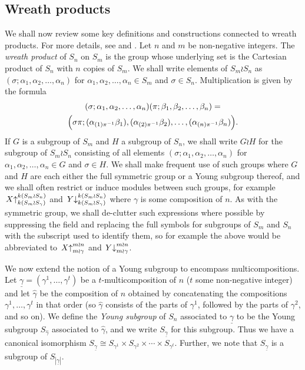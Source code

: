 \documentclass[ALCO,Unicode,published]{cedram}
\newcommand{\ul}[1]{\underline{#1}}
\begin{document}
\subsection{Wreath products}
We shall now review some key definitions and constructions connected to wreath products. For more details, see \cite{CHTAN} and
\cite[Chapter 4]{JAMKER}.
Let $n$ and $m$ be non-negative integers. The \textit{wreath product} of $S_n$ on $S_m$ is the group whose underlying set is the
Cartesian product of $S_n$ with $n$ copies of $S_m$. We shall write elements of $S_m{\wr}S_n$ as
$(\sigma;\alpha_1,\alpha_2,\ldots,\alpha_n)$ for $\alpha_1,\alpha_2,\ldots,\alpha_n \in S_m$ and $\sigma \in S_n$. Multiplication is given
by the formula
\begin{multline*}
	(\sigma;\alpha_1,\alpha_2,\ldots,\alpha_n)(\pi;\beta_1,\beta_2,\ldots,\beta_n) =\\
	\Bigl(\sigma\pi;(\alpha_{(1)\pi^{-1}}\beta_1),(\alpha_{(2)\pi^{-1}}\beta_2),\ldots,(\alpha_{(n)\pi^{-1}}\beta_n)\Bigr).
\end{multline*}
If $G$ is a subgroup of $S_m$ and $H$ a subgroup of $S_n$, we shall write $G{\wr}H$ for the subgroup of $S_m{\wr}S_n$
consisting of all elements $(\sigma;\alpha_1,\alpha_2,\ldots,\alpha_n)$ for $\alpha_1,\alpha_2,\ldots,\alpha_n \in G$ and $\sigma \in H$.
We shall make frequent use of such groups where $G$ and $H$ are each either the full symmetric group or a Young subgroup thereof, and we
shall often restrict or induce modules between such groups, for example
$\left.X\right\uparrow^{k(S_m{\wr}S_n)}_{k(S_m{\wr}S_\gamma)}$ and $\left.Y\right\downarrow^{k({S_m{\wr}S_n})}_{k({S_m{\wr}S_\gamma})}$
where $\gamma$ is some composition of $n$. As with the symmetric group, we shall de-clutter such expressions where possible by suppressing
the field and replacing the full symbols for subgroups of $S_m$ and $S_n$ with the subscript used to identify them,
so for example the above would be abbreviated to
$\left.X\right\uparrow^{m{\wr}n}_{m{\wr}\gamma}$ and $\left.Y\right\downarrow^{m{\wr}n}_{m{\wr}\gamma}$.

We now extend the notion of a Young subgroup to encompass multicompositions.
Let $\ul{\gamma} = (\gamma^1,\ldots,\gamma^t)$ be a $t$-multicomposition of $n$ ($t$ some non-negative integer) and let $\hat\gamma$ be
the composition of $n$ obtained by concatenating the compositions $\gamma^1,\ldots,\gamma^t$ in that order (so $\hat\gamma$ consists of
the parts of $\gamma^1$, followed by the parts of $\gamma^2$, and so on). We define the \textit{Young subgroup} of $S_n$ associated to
$\ul{\gamma}$ to be the Young subgroup $S_{\hat\gamma}$ associated to $\hat\gamma$, and we write $S_{\ul{\gamma}}$ for this subgroup. Thus we
have a canonical isomorphism $S_{\ul{\gamma}} \cong S_{\gamma^1} \times S_{\gamma^2} \times \cdots \times S_{\gamma^t}$.
Further, we note that $S_{\ul{\gamma}}$ is a subgroup of $S_{|\ul{\gamma}|}$.
\end{document}

